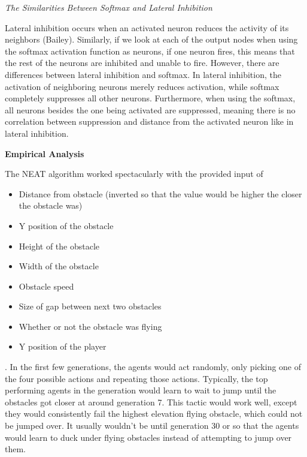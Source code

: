 \documentclass[12pt]{article}
\begin{document}
\begin{flushleft}
\hfill

\noindent\emph{The Similarities Between Softmax and Lateral Inhibition}

Lateral inhibition occurs when an activated neuron reduces the activity of its neighbors (Bailey). Similarly, if we look at each of the output nodes when using the softmax activation function as neurons, if one neuron fires, this means that the rest of the neurons are inhibited and unable to fire. However, there are differences between lateral inhibition and softmax. In lateral inhibition, the activation of neighboring neurons merely reduces activation, while softmax completely suppresses all other neurons. Furthermore, when using the softmax, all neurons besides the one being activated are suppressed, meaning there is no correlation between suppression and distance from the activated neuron like in lateral inhibition. 

\hfill

\hfill

\noindent\textbf{Empirical Analysis}

The NEAT algorithm worked spectacularly with the provided input of

\begin{itemize}
\item Distance from obstacle (inverted so that the value would be higher the closer the obstacle was)
\item Y position of the obstacle
\item Height of the obstacle
\item Width of the obstacle
\item Obstacle speed
\item Size of gap between next two obstacles
\item Whether or not the obstacle was flying
\item Y position of the player
\end{itemize}

. In the first few generations, the agents would act randomly, only picking one of the four possible actions and repeating those actions. Typically, the top performing agents in the generation would learn to wait to jump until the obstacles got closer at around generation 7. This tactic would work well, except they would consistently fail the highest elevation flying obstacle, which could not be jumped over. It usually wouldn't be until generation 30 or so that the agents would learn to duck under flying obstacles instead of attempting to jump over them.


\end{flushleft}
\end{document}
